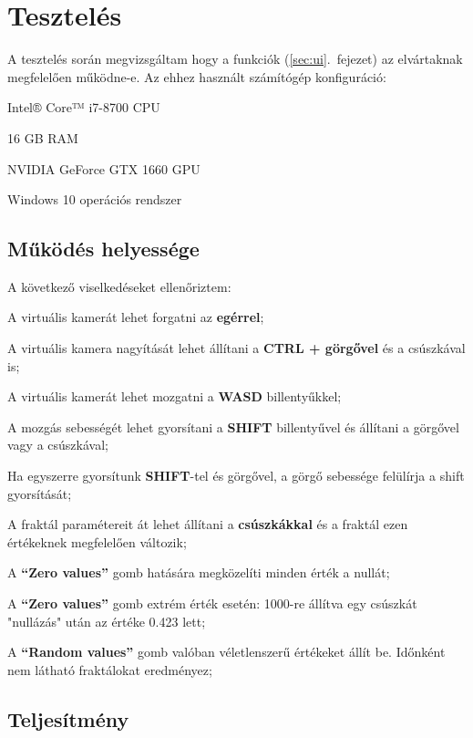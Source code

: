 \section{Tesztelés}

A tesztelés során megvizsgáltam hogy a funkciók (\ref{sec:ui}.~fejezet) az elvártaknak megfelelően működne-e. Az ehhez használt számítógép konfiguráció:
\begin{compactitem}
	\item Intel® Core™ i7-8700 CPU
	\item 16 GB RAM
	\item NVIDIA GeForce GTX 1660 GPU
	\item Windows 10 operációs rendszer
\end{compactitem}

\subsection{Működés helyessége}

A következő viselkedéseket ellenőriztem:
\begin{compactenum}
	\item A virtuális kamerát lehet forgatni az \textbf{egérrel};
	\item A virtuális kamera nagyítását lehet állítani a \textbf{CTRL + görgővel} és a csúszkával is;
	\item A virtuális kamerát lehet mozgatni a \textbf{WASD} billentyűkkel;
	\item A mozgás sebességét lehet gyorsítani a \textbf{SHIFT} billentyűvel és állítani a görgővel vagy a csúszkával;
	\item Ha egyszerre gyorsítunk \textbf{SHIFT}-tel és görgővel, a görgő sebessége felülírja a shift gyorsítását;
	\item A fraktál paramétereit át lehet állítani a \textbf{csúszkákkal} és a fraktál ezen értékeknek megfelelően változik;
	\item A \textbf{``Zero values''} gomb hatására megközelíti minden érték a nullát;
	\item A \textbf{``Zero values''} gomb extrém érték esetén: 1000-re állítva egy csúszkát "nullázás" után az értéke 0.423 lett;
	\item A \textbf{``Random values''} gomb valóban véletlenszerű értékeket állít be. Időnként nem látható fraktálokat eredményez;
\end{compactenum}

\subsection{Teljesítmény}

